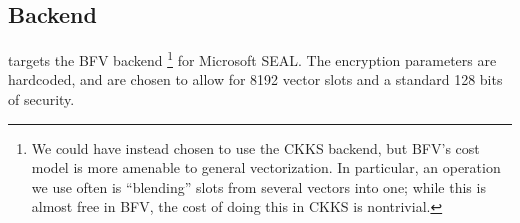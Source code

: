 
\subsection{Backend}
\system targets the BFV backend \footnote{We could have instead chosen to use the CKKS backend, but BFV's cost model is more amenable to general vectorization. In particular, an operation we use often is ``blending'' slots from several vectors into one; while this is almost free in BFV, the cost of doing this in CKKS is nontrivial. } for Microsoft SEAL\cite{seal}.
The encryption parameters are hardcoded, and are chosen to allow for 8192 vector slots and a standard 128 bits of security.